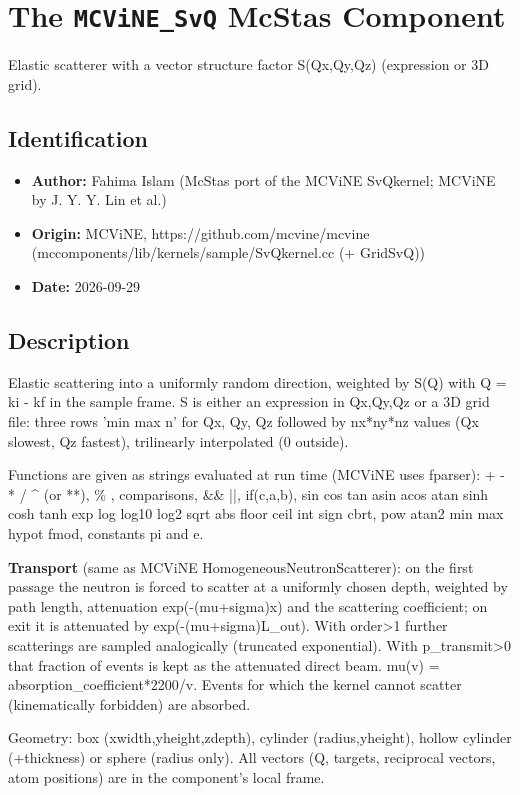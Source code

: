 \section{The \texttt{MCViNE\_SvQ} McStas Component}
Elastic scatterer with a vector structure factor S(Qx,Qy,Qz) (expression or 3D grid).

\subsection*{Identification}
\begin{itemize}
  \item \textbf{Author:} Fahima Islam (McStas port of the MCViNE SvQkernel; MCViNE by J. Y. Y. Lin et al.)
  \item \textbf{Origin:} MCViNE, https://github.com/mcvine/mcvine (mccomponents/lib/kernels/sample/SvQkernel.cc (+ GridSvQ))
  \item \textbf{Date:} 2026-09-29
\end{itemize}

\subsection*{Description}
Elastic scattering into a uniformly random direction, weighted by S(Q) with Q = ki - kf in the sample frame. S is either an expression in Qx,Qy,Qz or a 3D grid file: three rows 'min max n' for Qx, Qy, Qz followed by nx*ny*nz values (Qx slowest, Qz fastest), trilinearly interpolated (0 outside).

Functions are given as strings evaluated at run time (MCViNE uses fparser): + - * / \textasciicircum{} (or **), \% , comparisons, \&\& ||, if(c,a,b), sin cos tan asin acos atan sinh cosh tanh exp log log10 log2 sqrt abs floor ceil int sign cbrt, pow atan2 min max hypot fmod, constants pi and e.

\textbf{Transport} (same as MCViNE HomogeneousNeutronScatterer): on the first passage the neutron is forced to scatter at a uniformly chosen depth, weighted by path length, attenuation exp(-(mu+sigma)x) and the scattering coefficient; on exit it is attenuated by exp(-(mu+sigma)L\_out). With order\textgreater{}1 further scatterings are sampled analogically (truncated exponential). With p\_transmit\textgreater{}0 that fraction of events is kept as the attenuated direct beam. mu(v) = absorption\_coefficient*2200/v. Events for which the kernel cannot scatter (kinematically forbidden) are absorbed.

Geometry: box (xwidth,yheight,zdepth), cylinder (radius,yheight), hollow cylinder (+thickness) or sphere (radius only). All vectors (Q, targets, reciprocal vectors, atom positions) are in the component's local frame.

